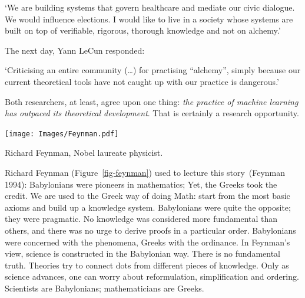 \documentclass[
  letterpaper,
  12pt,
  british]{tufte-book}
\renewenvironment{quote}{
  \list{}{\leftmargin=3.5cm\topsep=0pt}
  \item\relax\small\itshape
}
{\endlist}
\theoremstyle{plain}
\theoremstyle{plain}
\theoremstyle{definition}
\theoremstyle{remark}
\begin{document}
\begin{quote}
`We are building systems that govern healthcare and mediate our civic
dialogue. We would influence elections. I would like to live in a
society whose systems are built on top of verifiable, rigorous, thorough
knowledge and not on alchemy.'
\end{quote}

The next day, Yann LeCun responded:

\begin{quote}
`Criticising an entire community (\ldots) for practising ``alchemy'',
simply because our current theoretical tools have not caught up with our
practice is dangerous.'
\end{quote}

Both researchers, at least, agree upon one thing: \emph{the practice of
machine learning has outpaced its theoretical development}. That is
certainly a research opportunity.

\begin{marginfigure}

{\centering \texttt{[image: Images/Feynman.pdf]}

}

\caption{\label{fig-feynman}Richard Feynman, Nobel laureate physicist.}

\end{marginfigure}

Richard Feynman (Figure~\ref{fig-feynman}) used to lecture this
story~(Feynman
1994):
Babylonians were pioneers in mathematics; Yet, the Greeks took the
credit. We are used to the Greek way of doing Math: start from the most
basic axioms and build up a knowledge system. Babylonians were quite the
opposite; they were pragmatic. No knowledge was considered more
fundamental than others, and there was no urge to derive proofs in a
particular order. Babylonians were concerned with the phenomena, Greeks
with the ordinance. In Feynman's view, science is constructed in the
Babylonian way. There is no fundamental truth. Theories try to connect
dots from different pieces of knowledge. Only as science advances, one
can worry about reformulation, simplification and ordering. Scientists
are Babylonians; mathematicians are Greeks.
\end{document}
